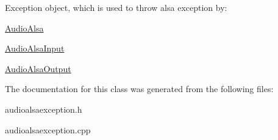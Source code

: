 Exception object, which is used to throw alsa exception by\-:
\begin{DoxyItemize}
\item \hyperlink{classNl_1_1AudioAlsa}{Audio\-Alsa}
\item \hyperlink{classNl_1_1AudioAlsaInput}{Audio\-Alsa\-Input}
\item \hyperlink{classNl_1_1AudioAlsaOutput}{Audio\-Alsa\-Output} 
\end{DoxyItemize}

The documentation for this class was generated from the following files\-:\begin{DoxyCompactItemize}
\item 
audioalsaexception.\-h\item 
audioalsaexception.\-cpp\end{DoxyCompactItemize}
